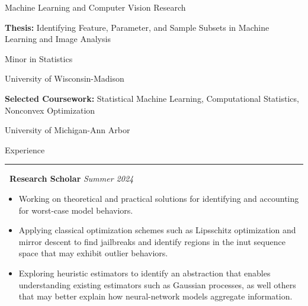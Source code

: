 \documentclass[]{article}
\begin{document}
	Machine Learning and Computer Vision Research
	
	\textbf{Thesis:} Identifying Feature, Parameter, and Sample Subsets in Machine Learning and Image Analysis
	
	Minor in Statistics
		

	{University of Wisconsin-Madison} 
	
		\textbf{Selected Coursework:} Statistical Machine Learning, Computational Statistics, Nonconvex Optimization

 
	{ University of Michigan-Ann Arbor }


\vspace{10pt}
{\LARGE Experience}
\hrule
\vspace{10pt}

 \newline
{\bf \ Research Scholar} \hfill \textit{Summer 2024}
\begin{itemize}[label={$\bullet$}]
	\item Working on theoretical and practical solutions for identifying and accounting for worst-case model behaviors.
	\item Applying classical optimization schemes such as Lipsschitz optimization and mirror descent to find jailbreaks and identify regions in the inut sequence space that may exhibit outlier behaviors.
	\item Exploring heuristic estimators to identify an abstraction that enables understanding existing estimators such as Gaussian processes, as well others that may better explain how neural-network models aggregate information.
\end{itemize} 
\end{document}
